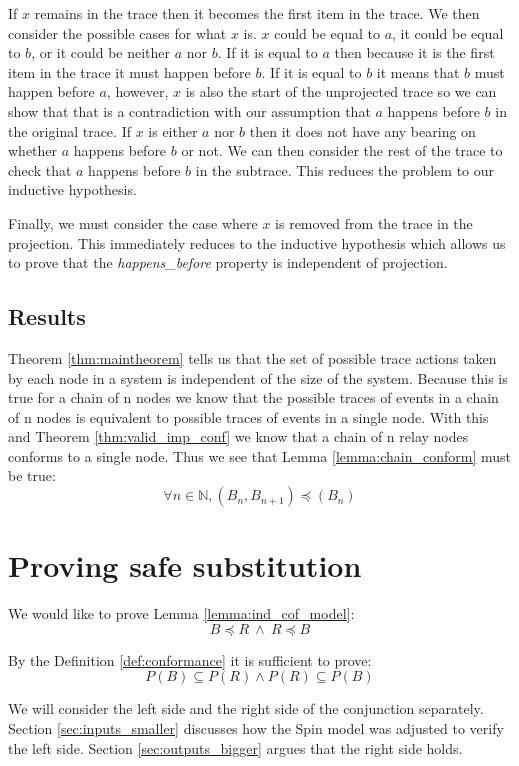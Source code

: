 \documentclass[runningheads]{llncs}
\begin{document}
If $x$ remains in the trace then it becomes the first item in the trace. 
We then consider the possible cases for what $x$ is.
$x$ could be equal to $a$, it could be equal to $b$, or it could be neither $a$ nor $b$.
If it is equal to $a$ then because it is the first item in the trace it must happen before $b$.
If it is equal to $b$ it means that $b$ must happen before $a$, however, $x$ is also the start of the unprojected trace so we can show that that is a contradiction with our assumption that $a$ happens before $b$ in the original trace.
If $x$ is either $a$ nor $b$ then it does not have any bearing on whether $a$ happens before $b$ or not. We can then consider the rest of the trace to check that $a$ happens before $b$ in the subtrace. This reduces the problem to our inductive hypothesis.

Finally, we must consider the case where $x$ is removed from the trace in the projection. This immediately reduces to the inductive hypothesis which allows us to prove that the \emph{happens\_before} property is independent of projection.

\subsection{Results}
Theorem \ref{thm:maintheorem} tells us that the set of possible trace actions taken by each node in a system is independent of the size of the system. Because this is true for a chain of n nodes we know that the possible traces of events in a chain of n nodes is equivalent to possible traces of events in a single node. With this and Theorem \ref{thm:valid_imp_conf} we know that a chain of n relay nodes conforms to a single node.
Thus we see that Lemma \ref{lemma:chain_conform} must be true:
$$\forall n \in \mathds{N}, (B_n, B_{n+1}) \preceq (B_n)
$$


\section{Proving safe substitution}
\label{sec:inputs_map}
We would like to prove Lemma \ref{lemma:ind_cof_model}:
$$B \preceq R\ 
\wedge\ 
R \preceq B$$

By the Definition \ref{def:conformance} it is sufficient to prove:
$$P(B) \subseteq P(R) \wedge P(R) \subseteq P(B)$$

We will consider the left side and the right side of the conjunction separately. 
Section \ref{sec:inputs_smaller} discusses how the Spin model was adjusted to verify the left side.
Section \ref{sec:outputs_bigger} argues that the right side holds.
\end{document}
